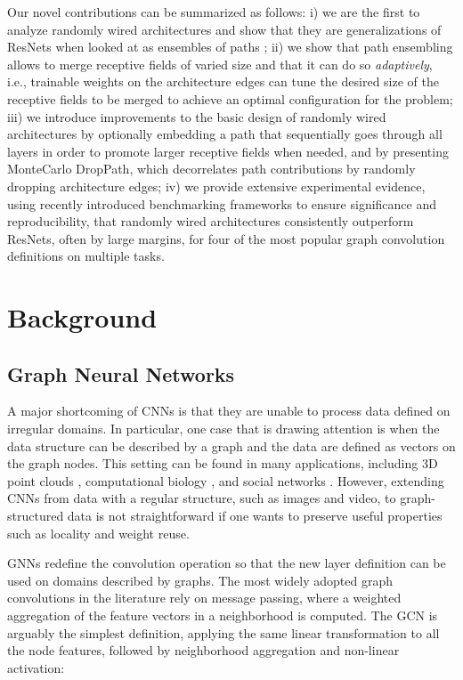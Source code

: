 \documentclass[10pt,twocolumn,twoside]{IEEEtran}
\begin{document}
Our novel contributions can be summarized as follows: i) we are the first to analyze randomly wired architectures and show that they are generalizations of ResNets when looked at as ensembles of paths \cite{veit2016residual}; ii) we show that path ensembling allows to merge receptive fields of varied size and that it can do so \textit{adaptively}, i.e., trainable weights on the architecture edges can tune the desired size of the receptive fields to be merged to achieve an optimal configuration for the problem; iii) we introduce improvements to the basic design of randomly wired architectures by optionally embedding a path that sequentially goes through all layers in order to promote larger receptive fields when needed, and by presenting MonteCarlo DropPath, which decorrelates path contributions by randomly dropping architecture edges; iv) we provide extensive experimental evidence, using recently introduced benchmarking frameworks \cite{dwivedi2020benchmarking, hu2020ogb} to ensure significance and reproducibility, that randomly wired architectures consistently outperform ResNets, often by large margins, for four of the most popular graph convolution definitions on multiple tasks. 





\section{Background}

\subsection{Graph Neural Networks}


A major shortcoming of CNNs is that they are unable to process data defined on irregular domains. In particular, one case that is drawing attention is when the data structure can be described by a graph and the data are defined as vectors on the graph nodes. This setting can be found in many applications, including 3D point clouds \cite{wang2019dynamic,valsesia2018learning}, computational biology \cite{alipanahi2015predicting, duvenaud2015convolutional}, and social networks \cite{kipf2016semi}. However, extending CNNs from data with a regular structure, such as images and video, to graph-structured data is not straightforward if one wants to preserve useful properties such as locality and weight reuse.

GNNs redefine the convolution operation so that the new layer definition can be used on domains described by graphs. The most widely adopted graph convolutions in the literature rely on message passing, where a weighted aggregation of the feature vectors in a neighborhood is computed. The GCN \cite{kipf2016semi} is arguably the simplest definition, applying the same linear transformation to all the node features, followed by neighborhood aggregation and non-linear activation:
\end{document}

